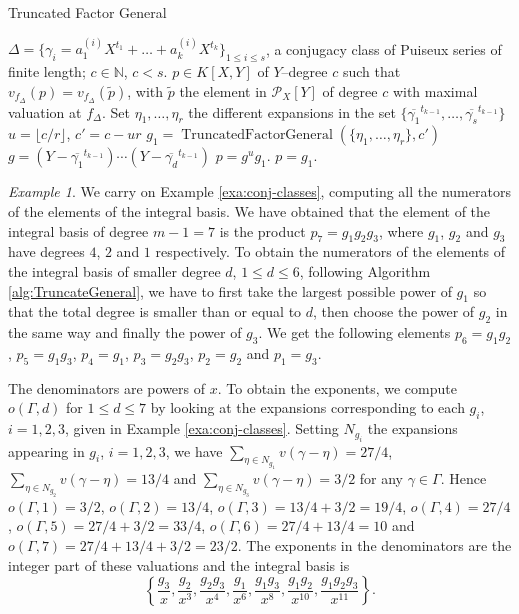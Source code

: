 \documentclass[a4paper,11pt]{amsart}%
\theoremstyle{definition}
\theoremstyle{plain}
\theoremstyle{remark}
\newtheorem{example}[defn]{Example}
\DeclareMathOperator{\TruncatedFactorGeneral}{TruncatedFactorGeneral}
\newcommand{\N}{{\mathbb N}}
\newcommand{\Px}{{\mathcal{P}_X}}
\begin{document}
\begin{algorithm}                      %
\caption{Truncated Factor General}          %
\label{alg:TruncateGeneral}
\begin{algorithmic}[1]
\REQUIRE $\Delta = \{\gamma_i = a_1^{(i)} X^{t_1} + \dots + a_k^{(i)} X^{t_k}\}_{1 \leq i \leq s}$, a conjugacy class of Puiseux series of finite length; $c \in \N$, $c < s$.
\ENSURE $p \in K[X, Y]$ of $Y$--degree $c$ such that $v_{f_\Delta}(p) = v_{f_\Delta}(\tilde p)$, with $\tilde p$ the element in $\Px[Y]$ of degree $c$ with maximal valuation at $f_\Delta$.
\STATE Set $\eta_1, \dots, \eta_r$ the different expansions in the set $\{\overline{\gamma_1}^{t_{k-1}}, \dots,  \overline{\gamma_s}^{t_{k-1}}\}$
\STATE $u = \lfloor c / r \rfloor$, $c' = c - ur$
\STATE $g_1 = \TruncatedFactorGeneral(\{\eta_1, \dots, \eta_r\}, c')$
\STATE $g = (Y- \overline{\gamma_1}^{t_{k-1}})\cdots(Y-\overline{\gamma_d}^{t_{k-1}})$
\RETURN $p = g^u g_1$.
\ELSE
\RETURN $p = g_1$.
\ENDIF
\end{algorithmic}
\end{algorithm}


\begin{example}
We carry on Example \ref{exa:conj-classes}, computing all the numerators of
the elements of the integral basis. We have obtained that the element of the
integral basis of degree $m-1 = 7$ is the product $p_{7} = g_{1}
g_{2} g_{3}$, where $g_{1}$, $g_{2}$ and $g_{3}$ have degrees $4$, $2$ and $1$
respectively. To obtain the numerators of the elements of the integral basis
of smaller degree $d$, $1 \le d \le 6$, following Algorithm
\ref{alg:TruncateGeneral}, we have to first take the largest possible power of
$g_{1}$ so that the total degree is smaller than or equal to $d$, then choose
the power of $g_{2}$ in the same way and finally the power of $g_{3}$. We get
the following elements $p_{6} = g_{1} g_{2}$, $p_{5} = g_{1} g_{3}$, $p_{4} =
g_{1}$, $p_{3} = g_{2} g_{3}$, $p_{2} = g_{2}$ and $p_{1} = g_{3}$.

The denominators are powers of $x$. To obtain the exponents, we compute
$o(\varGamma, d)$ for $1 \le d \le 7$ by looking at the expansions
corresponding to each $g_{i}$, $i =1, 2, 3$, given in Example
\ref{exa:conj-classes}. Setting $N_{g_{i}}$ the expansions appearing in
$g_{i}$, $i = 1, 2, 3$, we have $\sum_{\eta\in N_{g_{1}}} v(\gamma- \eta) =
27/4$, $\sum_{\eta\in N_{g_{2}}} v(\gamma- \eta) = 13/4$ and $\sum_{\eta\in
N_{g_{3}}} v(\gamma- \eta) = 3/2$ for any $\gamma\in\varGamma$. Hence
$o(\varGamma, 1) = 3/2$, $o(\varGamma, 2) = 13/4$, $o(\varGamma, 3) = 13/4 +
3/2 = 19/4$, $o(\varGamma, 4) = 27/4$, $o(\varGamma, 5) = 27/4 + 3/2 = 33/4$,
$o(\varGamma, 6) = 27/4 + 13/4 = 10$ and $o(\varGamma, 7) = 27/4 + 13/4 + 3/2
= 23/2$. The exponents in the denominators are the integer part of these
valuations and the integral basis is
\[
\left\{  \frac{g_{3}}{x}, \frac{g_{2}}{x^{3}}, \frac{g_{2} g_{3}}{x^{4}},
\frac{g_{1}}{x^{6}}, \frac{g_{1} g_{3}}{x^{8}}, \frac{g_{1} g_{2}}{x^{10}},
\frac{g_{1} g_{2} g_{3}}{x^{11}}\right\}.
\]
\end{example}
\end{document}
